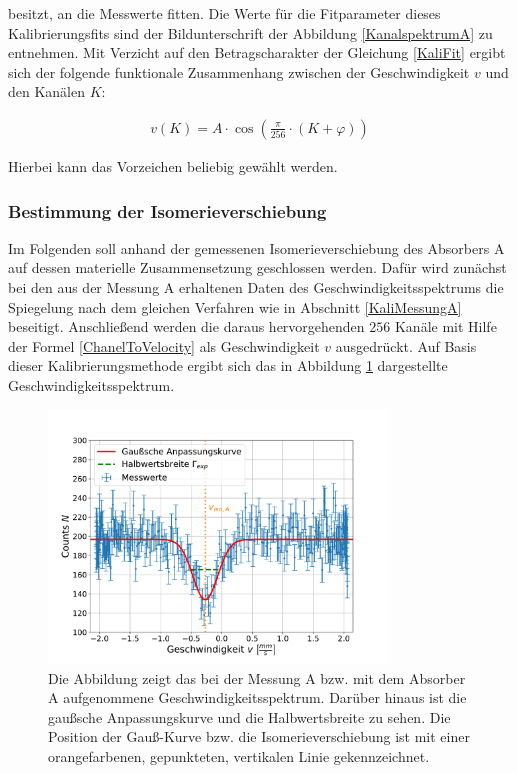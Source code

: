 \documentclass[
a4paper,                %
titlepage=firstiscover, %
captions=tableheading,  %
toc=bibliography,       %
toc=listof,             %
oneside,                %
automark,               %
12pt,                   %
english, ngerman,       %
parskip = half,         %
]{scrartcl}
\begin{document}
\noindent besitzt, an die Messwerte fitten.
Die Werte für die Fitparameter dieses Kalibrierungsfits sind der Bildunterschrift der Abbildung \ref{KanalspektrumA} zu entnehmen. 
Mit Verzicht auf den Betragscharakter der Gleichung \ref{KaliFit} ergibt sich der folgende funktionale Zusammenhang zwischen der Geschwindigkeit $v$ und den Kanälen $K$:

\begin{align} \label{ChanelToVelocity}
v(K)=A\cdot\cos\left(\frac{\pi}{256}\cdot (K+\varphi)\right)
\end{align}

\noindent Hierbei kann das Vorzeichen beliebig gewählt werden.


\subsubsection{Bestimmung der Isomerieverschiebung} \label{v_isoA}

Im Folgenden soll anhand der gemessenen Isomerieverschiebung des Absorbers A auf dessen materielle Zusammensetzung geschlossen werden.
Dafür wird zunächst bei den aus der Messung A erhaltenen Daten des Geschwindigkeitsspektrums die Spiegelung nach dem gleichen Verfahren wie in Abschnitt \ref{KaliMessungA} beseitigt.
Anschließend werden die daraus hervorgehenden $256$ Kanäle mit Hilfe der Formel \ref{ChanelToVelocity} als Geschwindigkeit $v$ ausgedrückt.
Auf Basis dieser Kalibrierungsmethode ergibt sich das in Abbildung \ref{GeschwindigkeitsspektrumA} dargestellte Geschwindigkeitsspektrum.

\begin{figure}[H]
	\centering
	\includegraphics[width=0.8\textwidth]{raw/GeschwindigkeitsspektrumA}
	\caption{Die Abbildung zeigt das bei der Messung A bzw. mit dem Absorber A aufgenommene Geschwindigkeitsspektrum. Darüber hinaus ist die gaußsche Anpassungskurve und die Halbwertsbreite zu sehen. Die Position der Gauß-Kurve bzw. die Isomerieverschiebung ist mit einer orangefarbenen, gepunkteten, vertikalen Linie gekennzeichnet.}
	\label{GeschwindigkeitsspektrumA}
\end{figure}
\end{document}

